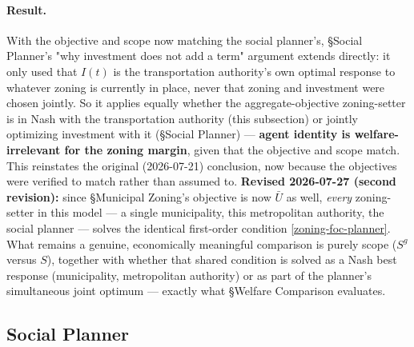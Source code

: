 \documentclass[12pt, a4paper]{article}
\theoremstyle{definition}
\theoremstyle{remark}
\begin{document}
\paragraph{Result.} With the objective and scope now matching the social planner's, \S Social Planner's "why investment does not add a term" argument extends directly: it only used that $I(t)$ is the transportation authority's own optimal response to whatever zoning is currently in place, never that zoning and investment were chosen jointly. So it applies equally whether the aggregate-objective zoning-setter is in Nash with the transportation authority (this subsection) or jointly optimizing investment with it (\S Social Planner) — \textbf{agent identity is welfare-irrelevant for the zoning margin}, given that the objective and scope match. This reinstates the original (2026-07-21) conclusion, now because the objectives were verified to match rather than assumed to. \textbf{Revised 2026-07-27 (second revision):} since \S Municipal Zoning's objective is now $\bar U$ as well, \emph{every} zoning-setter in this model — a single municipality, this metropolitan authority, the social planner — solves the identical first-order condition \eqref{zoning-foc-planner}. What remains a genuine, economically meaningful comparison is purely scope ($S^g$ versus $S$), together with whether that shared condition is solved as a Nash best response (municipality, metropolitan authority) or as part of the planner's simultaneous joint optimum — exactly what \S Welfare Comparison evaluates.

\subsection{Social Planner}
\end{document}
